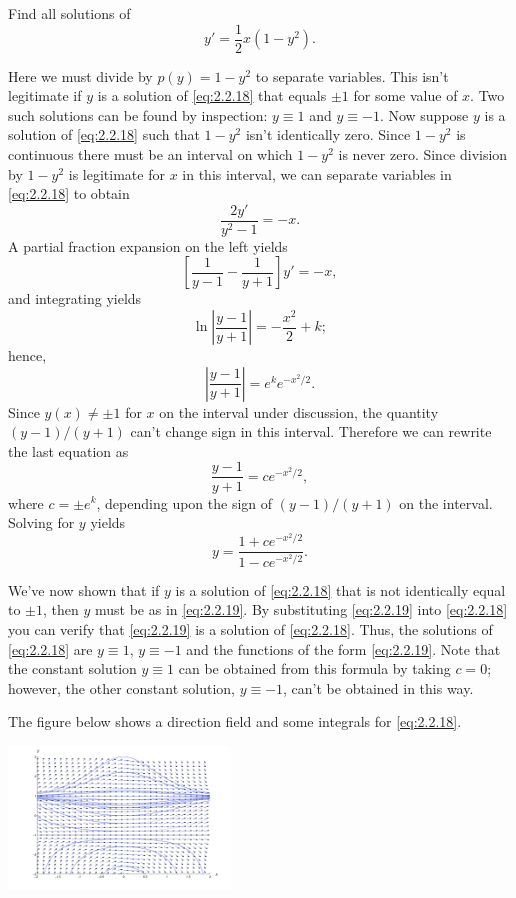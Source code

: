 \documentclass{ximera}
\begin{document}
\begin{example}\label{example:2.2.5}
Find all solutions of
\begin{equation} \label{eq:2.2.18}
y'=\frac{1}{2}x(1-y^2).
\end{equation}

\begin{explanation}

Here we must divide by $p(y)=1-y^2$ to separate variables.
This isn't  legitimate if $y$ is a solution of \eqref{eq:2.2.18} that
equals $\pm 1$ for some value of $x$. Two such solutions can be found
by inspection: $y \equiv 1$ and $y\equiv -1$. Now suppose
$y$ is a solution of \eqref{eq:2.2.18} such that $1-y^2$ isn't
identically zero. Since $1-y^2$ is continuous there must be an
interval on which $1-y^2$ is never zero. Since division by $1-y^2$ is
legitimate for $x$ in this interval, we can separate variables in
\eqref{eq:2.2.18} to obtain
$$
\frac{2y'}{y^2-1}=-x.
$$
 A partial fraction expansion on the left yields
$$
\left[\frac{1}{y-1}-\frac{1}{y+1}\right]y'=-x,
$$
and integrating  yields
$$
\ln\left|\frac{y-1}{y+1}\right|=-\frac{x^2}{2}+k;
$$
 hence,
$$
\left|\frac{y-1}{y+1}\right|=e^ke^{-x^2/2}.
$$
 Since $y(x)\neq \pm 1$ for $x$ on the interval under discussion, the
quantity
$(y-1)/(y+1)$  can't  change sign in this interval. Therefore
we can rewrite the last equation as
$$
\frac{y-1}{y+1}=ce^{-x^2/2},
$$
  where $c=\pm e^k$, depending upon the sign of $(y-1)/(y+1)$ on the
interval.
 Solving for  $y$ yields
\begin{equation} \label{eq:2.2.19}
y=\frac{1+ce^{-x^2/2}}{1-ce^{-x^2/2}}.
\end{equation}

We've now shown that if $y$ is a solution of \eqref{eq:2.2.18} that  is
not identically equal to $\pm 1$, then $y$ must be as in
\eqref{eq:2.2.19}. By substituting \eqref{eq:2.2.19} into \eqref{eq:2.2.18} you
 can verify that \eqref{eq:2.2.19} is  a solution of
\eqref{eq:2.2.18}. Thus,  the solutions of \eqref{eq:2.2.18}
are $y\equiv 1$, $y\equiv -1$ and the functions of the form
\eqref{eq:2.2.19}. Note that the constant solution $y \equiv 1$ can be
obtained from this formula by taking $c=0$;     however, the other
constant solution, $y \equiv -1$, can't be obtained in this way.

The figure below shows a direction field and some integrals for
\eqref{eq:2.2.18}.


\begin{image}
  \includegraphics[height=1.5in]{fig020204.jpg}
\end{image}
\end{explanation}
\end{example}
\end{document}
